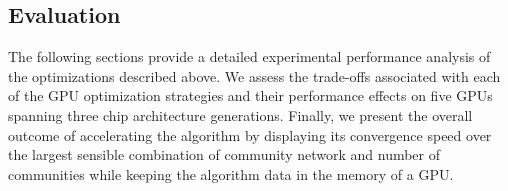 \subsection{Evaluation}
\label{sec-gpu-evaluation}

The following sections provide a detailed experimental performance analysis
of the optimizations described above.
%
We assess the trade-offs associated with each of the GPU optimization
strategies and their performance effects on five GPUs spanning three chip
architecture generations.
%
Finally, we present the overall outcome of accelerating the algorithm by
displaying its convergence speed over the largest sensible combination of
community network and number of communities while keeping the algorithm data
in the memory of a GPU.




% 


